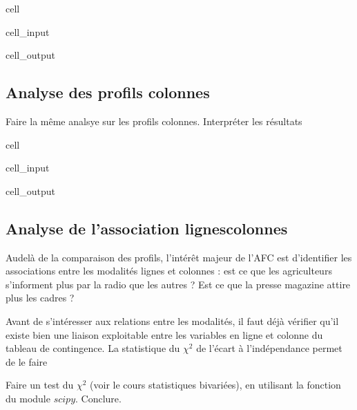 \documentclass[letterpaper,10pt,french]{sphinxmanual}
\begin{document}
\begin{sphinxuseclass}{cell}
\begin{sphinxuseclass}{cell_input}
\end{sphinxuseclass}
\begin{sphinxuseclass}{cell_output}
\noindent{}

\end{sphinxuseclass}
\end{sphinxuseclass}

\subsection{Analyse des profils colonnes}
\label{\detokenize{TP3_AFC_ACM:analyse-des-profils-colonnes}}
\sphinxAtStartPar
Faire la même analsye sur les profils colonnes. Interpréter les résultats

\begin{sphinxuseclass}{cell}
\begin{sphinxuseclass}{cell_input}
\begin{sphinxVerbatim}[commandchars=\\\{\}]
\end{sphinxVerbatim}

\end{sphinxuseclass}
\begin{sphinxuseclass}{cell_output}
\noindent{}

\end{sphinxuseclass}
\end{sphinxuseclass}

\subsection{Analyse de l’association lignes\sphinxhyphen{}colonnes}
\label{\detokenize{TP3_AFC_ACM:analyse-de-l-association-lignes-colonnes}}
\sphinxAtStartPar
Au\sphinxhyphen{}delà de la comparaison des profils, l’intérêt majeur de l’AFC est d’identifier les associations entre les modalités lignes et colonnes : est ce que les agriculteurs s’informent plus par la radio que les autres ? Est ce que la presse magazine attire plus les cadres ?

\sphinxAtStartPar
Avant de s’intéresser aux relations entre les modalités, il faut déjà vérifier qu’il existe bien une liaison exploitable entre les variables en ligne et colonne du tableau de contingence. La statistique du \(\chi^2\) de l’écart à l’indépendance permet de le faire

\sphinxAtStartPar
Faire un test du \(\chi^2\) (voir le cours statistiques bivariées), en utilisant la fonction  du module \(scipy\). Conclure.
\end{document}
